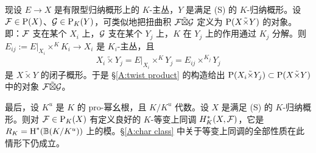 现设 $E\to X$ 是有限型归纳概形上的 $K$-主丛，$Y$ 是满足 (S) 的 $K$-归纳概形。设 ${\mathcal F}\in\operatorname{P}(X)$、${\mathcal G}\in\operatorname{P}_K(Y)$，可类似地把扭曲积 ${\mathcal F}\tilde\boxtimes{\mathcal G}$ 定义为 $\operatorname{P}(X\tilde\times Y)$ 的对象。即：${\mathcal F}$ 支在某个 $X_i$ 上，${\mathcal G}$ 支在某个 $Y_j$ 上，$K$ 在 $Y_j$ 上的作用通过 $K_j$ 分解。则 $E_{ij}:=E|_{X_i}\times^KK_i\to X_i$ 是 $K_i$-主丛，且
\[X_i\tilde\times Y_j= E|_{X_i}\times^KY_j= E_{ij}\times^{K_j}Y_j\]
是 $X\tilde\times Y$ 的闭子概形。于是 \S\ref{A:twist product} 的构造给出 $\operatorname{P}(X_i\tilde\times Y_j)\subset \operatorname{P}(X\tilde\times Y)$ 中的对象 ${\mathcal F}\tilde\boxtimes{\mathcal G}$。

最后，设 $K^u$ 是 $K$ 的 pro-幂幺根，且 $K/K^u$ 代数。设 $X$ 是满足 (S) 的 $K$-归纳概形。则对 ${\mathcal F}\in \operatorname{P}_K(X)$ 有定义良好的 $K$-等变上同调 $H_K^*(X,{\mathcal F})$，它是 $R_{K}=\operatorname{H}^*({\mathbb B} (K/K^u))$ 上的模。\S\ref{A:char class} 中关于等变上同调的全部性质在此情形下仍成立。
